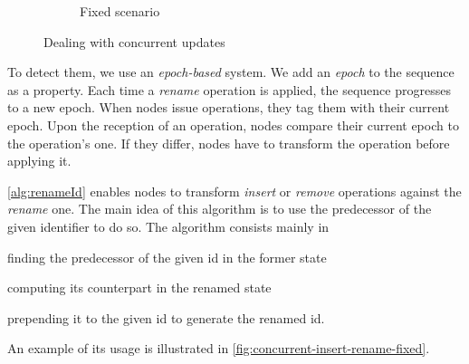 \documentclass[sigplan,10pt]{acmart}
\newcommand{\trm}[1]{\mathit{#1}}
\newcommand{\id}[3]{$\trm{#1}^{\trm{#2}}_{\trm{#3}}$}
\newcommand{\widthletter}{7mm}
\begin{document}
\begin{figure}[ht!]
\begin{subfigure}{\columnwidth}
        \caption{Fixed scenario}
        \label{fig:concurrent-insert-rename-fixed}
    \end{subfigure}
    \caption{Dealing with concurrent updates}
    \label{fig:concurrent-insert-rename}
\end{figure}

To detect them, we use an \emph{epoch-based} system.
We add an \emph{epoch} to the sequence as a property.
Each time a \emph{rename} operation is applied, the sequence progresses to a new epoch.
When nodes issue operations, they tag them with their current epoch.
Upon the reception of an operation, nodes compare their current epoch to the operation's one.
If they differ, nodes have to transform the operation before applying it.

\autoref{alg:renameId} enables nodes to transform \emph{insert} or \emph{remove} operations against the \emph{rename} one.
The main idea of this algorithm is to use the predecessor of the given identifier to do so.
The algorithm consists mainly in
\begin{enumerate*}
    \item finding the predecessor of the given id in the former state
    \item computing its counterpart in the renamed state
    \item prepending it to the given id to generate the renamed id.
\end{enumerate*}
An example of its usage is illustrated in \autoref{fig:concurrent-insert-rename-fixed}.
\end{document}
